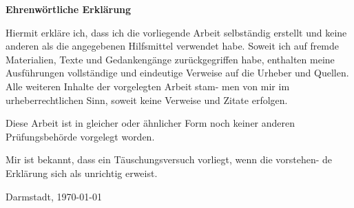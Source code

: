 \thispagestyle{empty}


\vspace*{\fill}

\begin{center}
  \begin{Large}
    \textbf{Ehrenwörtliche Erklärung}
  \end{Large}
\end{center}

\vspace{0.5cm}

\noindent %
\glqq Hiermit erkläre ich, dass ich die vorliegende Arbeit selbständig erstellt und keine anderen als die angegebenen Hilfsmittel verwendet habe. Soweit ich auf fremde Materialien, Texte und Gedankengänge zurückgegriffen habe, enthalten meine Ausführungen vollständige und eindeutige Verweise auf die Urheber und Quellen. Alle weiteren Inhalte der vorgelegten Arbeit stam- men von mir im urheberrechtlichen Sinn, soweit keine Verweise und Zitate erfolgen.

Diese Arbeit ist in gleicher oder ähnlicher Form noch keiner anderen Prüfungsbehörde vorgelegt worden.

Mir ist bekannt, dass ein Täuschungsversuch vorliegt, wenn die vorstehen- de Erklärung sich als unrichtig erweist.\grqq{}

\vspace{1.5cm}

{\raggedleft
Darmstadt, \today\\
}

\vspace*{\fill}
 
\restoregeometry